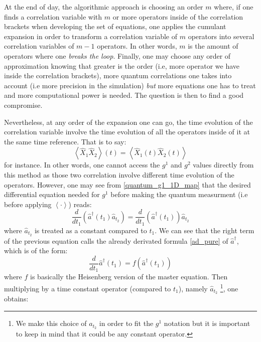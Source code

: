 \documentclass[11pt]{report}
\begin{document}
At the end of day, the algorithmic approach is choosing an order $m$ where, if one finds a correlation variable with $m$ or more operators inside of the correlation brackets when developing the set of equations, one applies the cumulant expansion in order to transform a correlation variable of $m$ operators into several correlation variables of $m-1$ operators. In other words, $m$ is the amount of operators where one \textit{breaks the loop}. Finally, one may choose any order of approximation knowing that greater is the order (i.e, more operator we have inside the correlation brackets), more quantum correlations one takes into account (i.e more precision in the simulation) \textit{but} more equations one has to treat and more computational power is needed. The question is then to find a good compromise.

Nevertheless, at any order of the expansion one can go, the time evolution of the correlation variable involve the time evolution of all the operators inside of it at the same time reference. That is to say:
\begin{equation}
\left\langle\hat{X}_1\hat{X}_2\right\rangle (t) = \left\langle\hat{X}_1(t)\hat{X}_2(t)\right\rangle
\end{equation}
for instance. In other words, one cannot access the $g^1$ and $g^2$ values directly from this method as those two correlation involve different time evolution of the operators. However, one may see from \eqref{quantum_g1_1D_map} that the desired differential equation needed for $g^1$ before making the quantum measurment (i.e before applying $\left\langle \cdot \right\rangle$) reads:
\begin{equation}
\frac{d}{dt_1} \left(\hat{a}^\dagger(t_1)\hat{a}_{t_2}\right) = \frac{d}{dt_1} \left(\hat{a}^\dagger(t_1)\right)\hat{a}_{t_2}
\end{equation}
where $\hat{a}_{t_2}$ is treated as a constant compared to $t_1$. We can see that the right term of the previous equation calls the already derivated formula \eqref{ad_pure} of $\hat{a}^\dagger$, which is of the form:
\begin{equation}
\frac{d}{dt_1} \hat{a}^\dagger(t_1) = f(\hat{a}^\dagger(t_1)) 
\end{equation}
where $f$ is basically the Heisenberg version of the master equation. Then multiplying by a time constant operator (compared to $t_1$), namely $\hat{a}_{t_2}$ \footnote{We make this choice of $\hat{a}_{t_2}$ in order to fit the $g^1$ notation but it is important to keep in mind that it could be any constant operator.}, one obtains:
\end{document}
